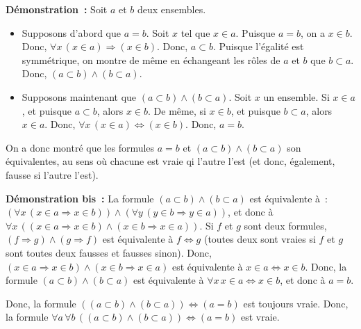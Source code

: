 \medskip

\noindent\textbf{Démonstration :} 
    Soit $a$ et $b$ deux ensembles. 
    \begin{itemize}[nosep]
        \item Supposons d'abord que $a = b$.
            Soit $x$ tel que $x \in a$. 
            Puisque $a = b$, on a $x \in b$. 
            Donc, $\forall x \, (x \in a) \Rightarrow (x \in b)$.
            Donc, $a \subset b$. 
            Puisque l'égalité est symmétrique, on montre de même en échangeant les rôles de $a$ et $b$ que $b \subset a$.
            Donc, $(a \subset b) \wedge (b \subset a)$. 
        \item Supposons maintenant que $(a \subset b) \wedge (b \subset a)$. 
            Soit $x$ un ensemble. 
            Si $x \in a$, et puisque $a \subset b$, alors $x \in b$.
            De même, si $x \in b$, et puisque $b \subset a$, alors $x \in a$.
            Donc, $\forall x \, (x \in a) \Leftrightarrow (x \in b)$. 
            Donc, $a = b$. 
    \end{itemize}
    On a donc montré que les formules $a = b$ et $(a \subset b) \wedge (b \subset a)$ son équivalentes, au sens où chacune est vraie qi l'autre l'est (et donc, également, fausse si l'autre l'est).

   \done 

\medskip

\noindent\textbf{Démonstration bis :} 
    La formule $(a \subset b) \wedge (b \subset a)$ est équivalente à : $(\forall x \, (x \in a \Rightarrow x \in b)) \wedge (\forall y \, (y \in b \Rightarrow y \in a))$, et donc à $\forall x \, ((x \in a \Rightarrow x \in b) \wedge (x \in b \Rightarrow x \in a))$. 
    Si $f$ et $g$ sont deux formules, $(f \Rightarrow g) \wedge (g \Rightarrow f)$ est équivalente à $f \Leftrightarrow g$ (toutes deux sont vraies si $f$ et $g$ sont toutes deux fausses et fausses sinon).
    Donc, $(x \in a \Rightarrow x \in b) \wedge (x \in b \Rightarrow x \in a)$ est équivalente à $x \in a \Leftrightarrow x \in b$.
    Donc, la formule $(a \subset b) \wedge (b \subset a)$ est équivalente à $\forall x \, x \in a \Leftrightarrow x \in b$, et donc à $a = b$.

    Donc, la formule $((a \subset b) \wedge (b \subset a)) \Leftrightarrow (a = b)$ est toujours vraie. 
    Donc, la formule $\forall a \, \forall b \, ((a \subset b) \wedge (b \subset a)) \Leftrightarrow (a = b)$ est vraie. 

    \done

\medskip

